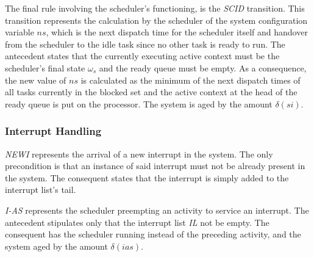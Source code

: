 The final rule involving the scheduler's functioning, is the
\emph{SCID} transition. This transition represents the calculation by
the scheduler of the system configuration variable $ns$, which is the
next dispatch time for the scheduler itself and handover from the
scheduler to the idle task since no other task is ready to run. The
antecedent states that the currently executing active context must be
the scheduler's final state $\omega_s$ and the ready queue must be
empty. As a consequence, the new value of $ns$ is calculated as the
minimum of the next dispatch times of all tasks currently in the
blocked set and the active context at the head of the ready queue is
put on the processor. The system is aged by the amount $\delta(si)$.


\subsubsection{Interrupt Handling}
\emph{NEWI} represents the arrival of a new interrupt in the
system. The only precondition is that an instance of said interrupt
must not be already present in the system. The consequent states that
the interrupt is simply added to the interrupt list's tail.


\emph{I-AS} represents the scheduler preempting an activity to service
an interrupt. The antecedent stipulates only that the interrupt list
\emph{IL} not be empty. The consequent has the scheduler running
instead of the preceding activity, and the system aged by the amount
$\delta(ias)$. 


